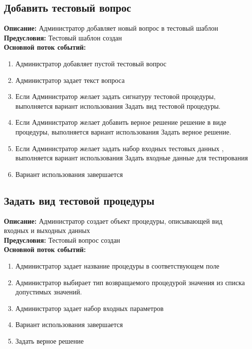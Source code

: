 \documentclass{article}
\begin{document}
    \subsection{Добавить тестовый вопрос}
    \textbf{Описание:} Администратор добавляет новый вопрос в тестовый шаблон\\
    \textbf{Предусловия:} Тестовый шаблон создан\\
    \textbf{Основной поток событий:}
    \begin{enumerate}
        \item Администратор добавляет пустой тестовый вопрос
        \item Администратор задает текст вопроса
        \item Если Администратор желает задать сигнатуру тестовой процедуры, выполняется вариант использования Задать вид тестовой процедуры.
        \item Если Администратор желает добавить верное решение решение в виде процедуры, выполняется вариант использования Задать верное решение.
        \item Если Администратор желает задать набор входных тестовых данных , выполняется вариант использования Задать входные данные для тестирования
        \item Вариант использования завершается
    \end{enumerate}


    \subsection{Задать вид тестовой процедуры}
    \textbf{Описание:} Администратор создает объект процедуры, описывающей вид входных и выходных данных\\
    \textbf{Предусловия:} Тестовый вопрос создан\\
    \textbf{Основной поток событий:}
    \begin{enumerate}
        \item Администратор задает название процедуры в соответствующем поле
        \item Администратор выбирает тип возвращаемого процедурой значения из списка допустимых значений.
        \item Администратор задает набор входных параметров
        \item Вариант использования завершается
        \item Задать верное решение
    \end{enumerate}
    
\end{document}
